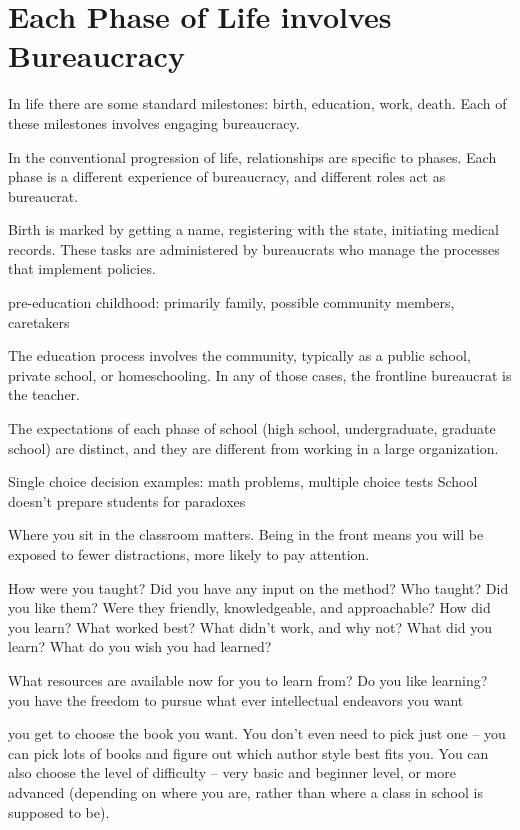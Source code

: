 \section{Each Phase of Life involves Bureaucracy}
In life there are some standard milestones: birth, education, work, death. Each of these milestones involves engaging bureaucracy. 

In the conventional progression of life, relationships are specific to phases. Each phase is a different experience of bureaucracy, and different roles act as bureaucrat. 


Birth is marked by getting a name, registering with the state, initiating medical records. These tasks are administered by bureaucrats who manage the processes that implement policies. 

pre-education childhood: primarily family, possible community members, caretakers


The education process involves the community, typically as a public school, private school, or homeschooling. In any of those cases, the frontline bureaucrat is the teacher. 


The expectations of each phase of school (high school, undergraduate, graduate school) are distinct, and they are different from working in a large organization. 

Single choice decision examples: math problems, multiple choice tests
School doesn't prepare students for paradoxes

Where you sit in the classroom matters. Being in the front means you will be exposed to fewer distractions, more likely to pay attention.


How were you taught? Did you have any input on the method?
Who taught? Did you like them? Were they friendly, knowledgeable, and approachable?
How did you learn? What worked best? What didn't work, and why not?
What did you learn? What do you wish you had learned?

What resources are available now for you to learn from? Do you like learning?
you have the freedom to pursue what ever intellectual endeavors you want

you get to choose the book you want. You don't even need to pick just one -- you can pick lots of books and figure out which author style best fits you. You can also choose the level of difficulty -- very basic and beginner level, or more advanced (depending on where you are, rather than where a class in school is supposed to be).

